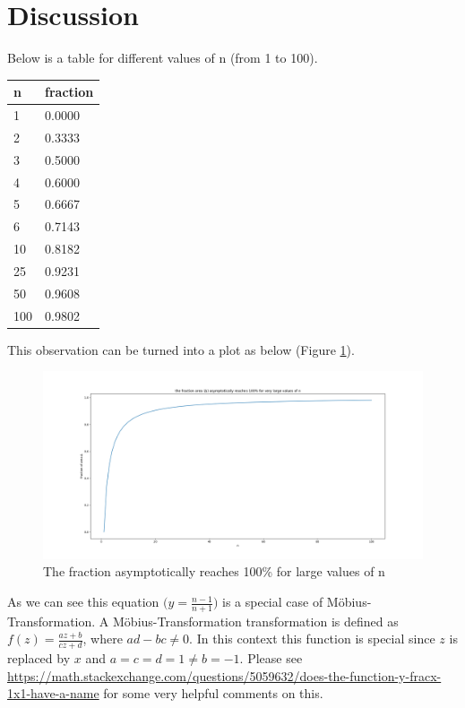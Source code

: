\documentclass[10pt, twoside]{article}
\begin{document}
\section{Discussion}
Below is a table for different values of n (from 1 to 100).\newline
\begin{tabular}{|l || l |}
	\hline
	\textbf{n} & \textbf{fraction} \\
	\hline
	1 & 0.0000 \\
	\hline
	2 & 0.3333 \\
	\hline
	3 & 0.5000 \\
	\hline
	4 & 0.6000 \\
	\hline
	5 & 0.6667 \\
	\hline
	6 & 0.7143 \\
	\hline
	10 & 0.8182 \\
	\hline
	25 & 0.9231 \\
	\hline
	50 & 0.9608 \\
	\hline
	100 & 0.9802 \\
	\hline
\end{tabular}
\newline
\newline
This observation can be turned into a plot as below (Figure \ref{n_vs_frac}).\newline
\begin{figure}[h!]
\includegraphics[width=\linewidth]{Overall_Plot.png}
\caption{The fraction asymptotically reaches 100\% for large values of n}
\label{n_vs_frac}
\end{figure}
\newline
As we can see this equation $\Big(y=\frac{n-1}{n+1}\Big)$ is a special case of  Möbius-Transformation. A Möbius-Transformation transformation is defined as $f(z) = \frac{az+b}{cz+d}$, where $ad-bc \ne 0$. In this context this function is special since $z$ is replaced by $x$ and $a=c=d=1 \ne b=-1$. Please see \url{https://math.stackexchange.com/questions/5059632/does-the-function-y-fracx-1x1-have-a-name} for some very helpful comments on this. 
\end{document}
